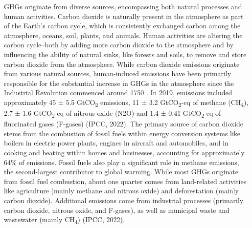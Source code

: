GHGs originate from diverse sources, encompassing both natural processes and human activities. Carbon dioxide is naturally present in the atmosphere as part of the Earth's carbon cycle, which is consistently exchanged carbon among the atmosphere, oceans, soil, plants, and animals. Human activities are altering the carbon cycle–both by adding more carbon dioxide to the atmosphere and by influencing the ability of natural sinks, like forests and soils, to remove and store carbon dioxide from the atmosphere. While carbon dioxide emissions originate from various natural sources, human-induced emissions have been primarily responsible for the substantial increase in GHGs in the atmosphere since the Industrial Revolution commenced around 1750 \citep{RN3}. In 2019, emissions included approximately 45 ± 5.5 GtCO\textsubscript{2} emissions, 11 ± 3.2 GtCO\textsubscript{2}-eq of methane (CH\textsubscript{4}), 2.7 ± 1.6 GtCO\textsubscript{2}-eq of nitrous oxide (N2O) and 1.4 ± 0.41 GtCO\textsubscript{2}-eq of fluorinated gases (F-gases) (IPCC, 2022). The primary source of carbon dioxide stems from the combustion of fossil fuels within energy conversion systems like boilers in electric power plants, engines in aircraft and automobiles, and in cooking and heating within homes and businesses, accounting for approximately 64\% of emissions. Fossil fuels also play a significant role in methane emissions, the second-largest contributor to global warming. While most GHGs originate from fossil fuel combustion, about one quarter comes from land-related activities like agriculture (mainly methane and nitrous oxide) and deforestation (mainly carbon dioxide). Additional emissions come from industrial processes (primarily carbon dioxide, nitrous oxide, and F-gases), as well as municipal waste and wastewater (mainly CH\textsubscript{4}) (IPCC, 2022). 

